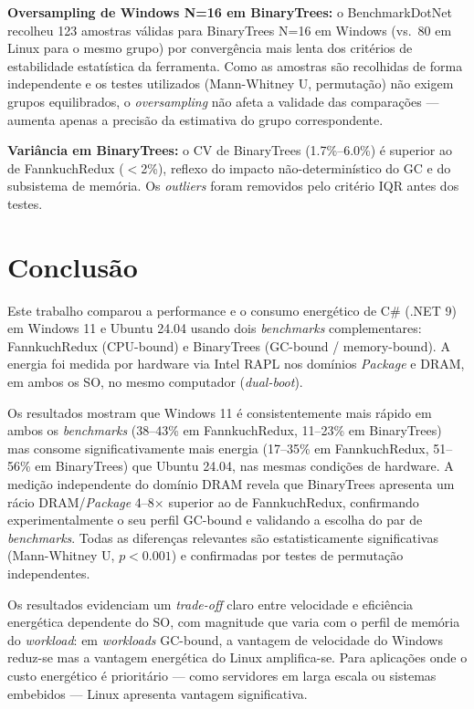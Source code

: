 \documentclass[12pt,a4paper]{article}
\begin{document}
\textbf{Oversampling de Windows N=16 em BinaryTrees:} o BenchmarkDotNet recolheu
123 amostras válidas para BinaryTrees N=16 em Windows (vs.\ 80 em Linux para
o mesmo grupo) por convergência mais lenta dos critérios de estabilidade
estatística da ferramenta.
Como as amostras são recolhidas de forma independente e os testes utilizados
(Mann-Whitney U, permutação) não exigem grupos equilibrados, o
\textit{oversampling} não afeta a validade das comparações --- aumenta apenas
a precisão da estimativa do grupo correspondente.

\textbf{Variância em BinaryTrees:} o CV de BinaryTrees (1.7\%--6.0\%) é
superior ao de FannkuchRedux ($<$2\%), reflexo do impacto não-determinístico
do GC e do subsistema de memória.
Os \textit{outliers} foram removidos pelo critério IQR antes dos testes.

\section{Conclusão}
\label{sec:conclusao}

Este trabalho comparou a performance e o consumo energético de C\# (.NET 9) em
Windows 11 e Ubuntu 24.04 usando dois \textit{benchmarks} complementares:
FannkuchRedux (CPU-bound) e BinaryTrees (GC-bound / memory-bound).
A energia foi medida por hardware via Intel RAPL nos domínios \textit{Package}
e DRAM, em ambos os SO, no mesmo computador (\textit{dual-boot}).

Os resultados mostram que Windows 11 é consistentemente mais rápido em ambos
os \textit{benchmarks} (38--43\% em FannkuchRedux, 11--23\% em BinaryTrees)
mas consome significativamente mais energia (17--35\% em FannkuchRedux,
51--56\% em BinaryTrees) que Ubuntu 24.04, nas mesmas condições de hardware.
A medição independente do domínio DRAM revela que BinaryTrees apresenta um
rácio DRAM/\textit{Package} 4--8$\times$ superior ao de FannkuchRedux,
confirmando experimentalmente o seu perfil GC-bound e validando a escolha do
par de \textit{benchmarks}.
Todas as diferenças relevantes são estatisticamente significativas
(Mann-Whitney U, $p < 0.001$) e confirmadas por testes de permutação
independentes.

Os resultados evidenciam um \textit{trade-off} claro entre velocidade e
eficiência energética dependente do SO, com magnitude que varia com o perfil
de memória do \textit{workload}: em \textit{workloads} GC-bound, a vantagem
de velocidade do Windows reduz-se mas a vantagem energética do Linux
amplifica-se.
Para aplicações onde o custo energético é prioritário --- como servidores em
larga escala ou sistemas embebidos --- Linux apresenta vantagem significativa.
\end{document}
